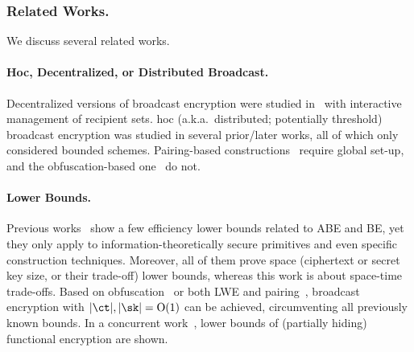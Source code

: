 \subsubsection{Related Works.}
We discuss several related works.

\paragraph{\Ad Hoc, Decentralized, or Distributed Broadcast.}
Decentralized versions of broadcast encryption were
studied in~\cite{SCN:PhaPoiStr12,PAIRING:DelPaiPoi07}
with interactive management of recipient sets.
\Ad hoc (a.k.a.~distributed; potentially threshold) broadcast encryption was
studied in several prior/later works,
all of which only considered bounded schemes.
Pairing-based constructions~\cite{DHMR08,CCS:WQZD10,KolMalWee23}
require global set-up, and
the obfuscation-based one~\cite{C:BonZha14} do not.

\paragraph{Lower Bounds.}
Previous works~\cite{EC:BluCre94,EC:LubSta98,AC:KYDB98,AFRICACRYPT:AusKre08,AC:KatYer09,C:GayKerWee15,ITC:DLY21} show a few efficiency lower bounds related to ABE and BE,
yet they only apply to information-theoretically secure primitives and even specific construction techniques.
Moreover, all of them prove space (ciphertext or secret key size, or their trade-off) lower bounds, whereas
this work is about space-time trade-offs.
Based on obfuscation~\cite{C:BonWatZha14} or both LWE and pairing~\cite{EC:AgrYam20}, broadcast encryption with ${|\ct|,|\sk|=\bigO(1)}$ can be achieved,
circumventing all previously known bounds.
In a concurrent work~\cite{EC:JaiLinLuo23},
lower bounds of (partially hiding) functional encryption are shown.
